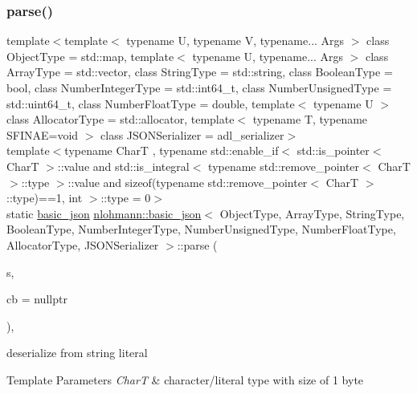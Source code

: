 \subsubsection{\texorpdfstring{parse()}{parse()}\hspace{0.1cm}{\footnotesize\ttfamily [2/6]}}
{\footnotesize\ttfamily template$<$template$<$ typename U, typename V, typename... Args $>$ class Object\+Type = std\+::map, template$<$ typename U, typename... Args $>$ class Array\+Type = std\+::vector, class String\+Type  = std\+::string, class Boolean\+Type  = bool, class Number\+Integer\+Type  = std\+::int64\+\_\+t, class Number\+Unsigned\+Type  = std\+::uint64\+\_\+t, class Number\+Float\+Type  = double, template$<$ typename U $>$ class Allocator\+Type = std\+::allocator, template$<$ typename T, typename S\+F\+I\+N\+A\+E=void $>$ class J\+S\+O\+N\+Serializer = adl\+\_\+serializer$>$ \\
template$<$typename CharT , typename std\+::enable\+\_\+if$<$ std\+::is\+\_\+pointer$<$ Char\+T $>$\+::value and std\+::is\+\_\+integral$<$ typename std\+::remove\+\_\+pointer$<$ Char\+T $>$\+::type $>$\+::value and sizeof(typename std\+::remove\+\_\+pointer$<$ Char\+T $>$\+::type)==1, int $>$\+::type  = 0$>$ \\
static \mbox{\hyperlink{classnlohmann_1_1basic__json}{basic\+\_\+json}} \mbox{\hyperlink{classnlohmann_1_1basic__json}{nlohmann\+::basic\+\_\+json}}$<$ Object\+Type, Array\+Type, String\+Type, Boolean\+Type, Number\+Integer\+Type, Number\+Unsigned\+Type, Number\+Float\+Type, Allocator\+Type, J\+S\+O\+N\+Serializer $>$\+::parse (\begin{DoxyParamCaption}\item[{const CharT}]{s,  }\item[{const \mbox{\hyperlink{classnlohmann_1_1basic__json_aecae491e175f8767c550ae3c59e180e3}{parser\+\_\+callback\+\_\+t}}}]{cb = {\ttfamily nullptr} }\end{DoxyParamCaption})\hspace{0.3cm}{\ttfamily [inline]}, {\ttfamily [static]}}



deserialize from string literal 


\begin{DoxyTemplParams}{Template Parameters}
{\em CharT} & character/literal type with size of 1 byte \\
\hline
\end{DoxyTemplParams}

